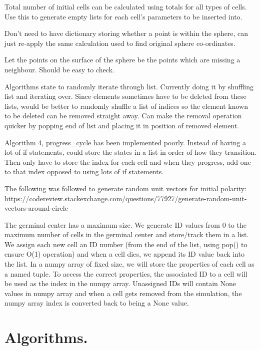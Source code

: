 \documentclass[english]{article}
\begin{document}
Total number of initial cells can be calculated using totals for all types of cells. Use this to generate empty lists for each cell's parameters to be inserted into. 

Don't need to have dictionary storing whether a point is within the sphere, can just re-apply the same calculation used to find original sphere co-ordinates. 

Let the points on the surface of the sphere be the points which are missing a neighbour. Should be easy to check.

Algorithms state to randomly iterate through list. Currently doing it by shuffling list and iterating over. Since elements sometimes have to be deleted from these lists, would be better to randomly shuffle a list of indices so the element known to be deleted can be removed straight away. Can make the removal operation quicker by popping end of list and placing it in position of removed element. 

Algorithm 4, progress\_cycle has been implemented poorly. Instead of having a lot of if statements, could store the states in a list in order of how they transition. Then only have to store the index for each cell and when they progress, add one to that index opposed to using lots of if statements. 

The following was followed to generate random unit vectors for initial polarity: https://codereview.stackexchange.com/questions/77927/generate-random-unit-vectors-around-circle

The germinal center has a maximum size. We generate ID values from 0 to the maximum number of cells in the germinal center and store/track them in a list. We assign each new cell an ID number (from the end of the list, using pop() to ensure O(1) operation) and when a cell dies, we append its ID value back into the list. In a numpy array of fixed size, we will store the properties of each cell as a named tuple. To access the correct properties, the associated ID to a cell will be used as the index in the numpy array. Unassigned IDs will contain None values in numpy array and when a cell gets removed from the simulation, the numpy array index is converted back to being a None value. 



\section{Algorithms.}
\end{document}
